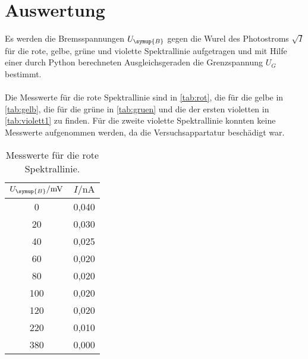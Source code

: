 \section{Auswertung}
\label{sec:Auswertung}
Es werden die Bremsspannungen $U_{\symup{B}}$ gegen die Wurel des Photostroms $\sqrt{I}$ für die
rote, gelbe, grüne und violette Spektrallinie aufgetragen und mit Hilfe einer durch
Python berechneten Ausgleichsgeraden die Grenzspannung $U_G$ bestimmt.\\
\\
Die Messwerte für die rote Spektrallinie sind in \autoref{tab:rot}, die für die gelbe in \autoref{tab:gelb},
die für die grüne in \autoref{tab:gruen} und die der ersten violetten in \autoref{tab:violett1} zu finden.
Für die zweite violette Spektrallinie konnten keine Messwerte aufgenommen werden, da die Versuchsappartatur
beschädigt war.
\begin{table}[H]
    \centering
    \caption{Messwerte für die rote Spektrallinie.}
    \label{tab:rot}
    \begin{tabular}{c c}
        \toprule
        $U_{\symup{B}} / \unit{\milli\volt}$ & $I / \unit{\nano\ampere}$ \\
        \midrule
          0 & 0,040 \\
         20 & 0,030 \\
         40 & 0,025 \\
         60 & 0,020 \\
         80 & 0,020 \\
        100 & 0,020 \\
        120 & 0,020 \\
        220 & 0,010 \\
        380 & 0,000 \\
        \bottomrule
    \end{tabular}
\end{table}

